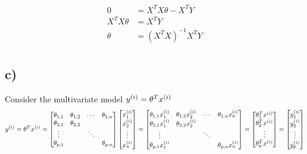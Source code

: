 \documentclass[11pt]{article}
\begin{document}
\begin{align*}
    0            &= X^T X \theta - X^T Y \\
    X^T X \theta &= X^T Y \\
    \theta       &= (X^T X)^{-1} X^T Y \\
\end{align*}

\subsection*{c)}

Consider the multivariate model $y^{(i)} = \theta^{T} x^{(i)}$
\begin{align*}
    y^{(i)} = \theta^{T} x^{(i)} = 
    \begin{bmatrix}
        \theta_{1,1} & \theta_{1,2} & \cdots & \theta_{1,n} \\
        \theta_{2,1} & \theta_{2,2} &        &              \\
        \vdots       &              & \ddots &              \\
        \theta_{p,1} &              &        & \theta_{p,n} \\
    \end{bmatrix}
    \begin{bmatrix}
        x^{(i)}_1 \\
        x^{(i)}_2 \\
        \vdots \\
        x^{(i)}_n \\
    \end{bmatrix}
    =
    \begin{bmatrix}
        \theta_{1,1} x^{(i)}_1 & \theta_{1,2} x^{(i)}_2 & \cdots & \theta_{1,n} x^{(i)}_n \\
        \theta_{2,1} x^{(i)}_1 & \theta_{2,2} x^{(i)}_2 &        &                      \\
        \vdots               &                      & \ddots &                      \\
        \theta_{p,1} x^{(i)}_1 &                      &        & \theta_{p,n} x^{(i)}_n \\
    \end{bmatrix}
    =
    \begin{bmatrix}
        \theta_1^T x^{(i)} \\
        \theta_2^T x^{(i)} \\
        \vdots         \\
        \theta_p^T x^{(i)} \\
    \end{bmatrix}
    =
    \begin{bmatrix}
        y^{(i)}_1 \\
        y^{(i)}_2 \\
        \vdots  \\
        y^{(i)}_p \\
    \end{bmatrix}
\end{align*}
\end{document}

